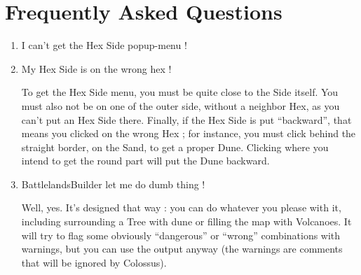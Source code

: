 \documentclass{article}
\begin{document}
\section{Frequently Asked Questions}

\begin{enumerate}

\item I can't get the Hex Side popup-menu !
\item My Hex Side is on the wrong hex !

To get the Hex Side menu, you must be quite close
to the Side itself. You must also not be on one
of the outer side, without a neighbor Hex, as you
can't put an Hex Side there. Finally, if the Hex
Side is put ``backward'', that means you clicked on
the wrong Hex ; for instance, you must click behind
the straight border, on the Sand, to get a proper
Dune. Clicking where you intend to get the round
part will put the Dune backward.

\item BattlelandsBuilder let me do dumb thing !

Well, yes. It's designed that way : you can do
whatever you please with it, including surrounding
a Tree with dune or filling the map with Volcanoes.
It will try to flag some obviously ``dangerous''
or ``wrong'' combinations with warnings, but you
can use the output anyway (the warnings are
comments that will be ignored by Colossus).

\end{enumerate}
\end{document}
